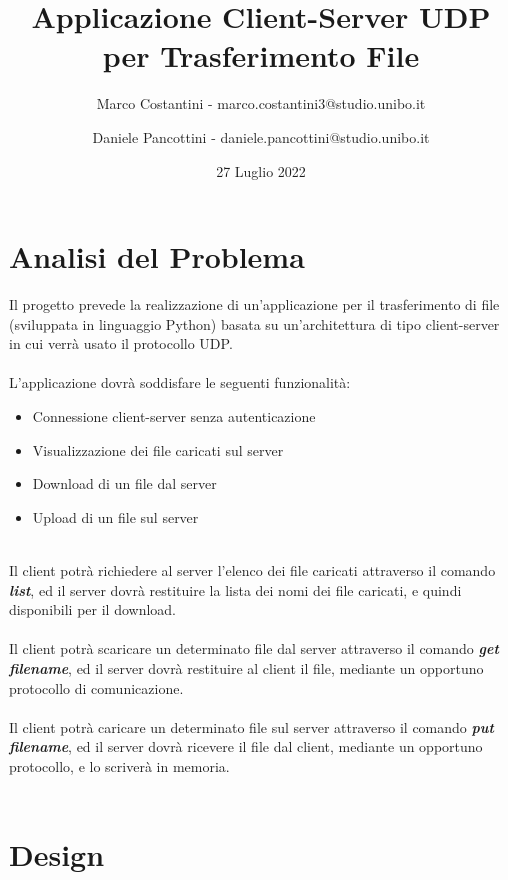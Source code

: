 \documentclass{article}
\title{Applicazione Client-Server UDP per Trasferimento File}
\author{Marco Costantini - marco.costantini3@studio.unibo.it \and Daniele Pancottini - daniele.pancottini@studio.unibo.it}
\date{27 Luglio 2022}
\begin{document}
\maketitle
\newpage

\tableofcontents

\newpage
\section{Analisi del Problema}


Il progetto prevede la realizzazione di un'applicazione per il trasferimento di file (sviluppata in linguaggio Python) basata su un'architettura di tipo client-server in cui verrà usato il protocollo UDP.\\\\
L'applicazione dovrà soddisfare le seguenti funzionalità:

	\begin{itemize}
		\item Connessione client-server senza autenticazione
		\item Visualizzazione dei file caricati sul server
		\item Download di un file dal server
		\item Upload di un file sul server
	\end{itemize}
\ \\
Il client potrà richiedere al server l'elenco dei file caricati attraverso il comando \textbf{\emph{list}}, ed il server dovrà restituire la lista dei nomi dei file caricati, e quindi disponibili per il download.\\\\
Il client potrà scaricare un determinato file dal server attraverso il comando \textbf{\emph{get filename}}, ed il server dovrà restituire al client il file, mediante un opportuno protocollo di comunicazione.\\\\
Il client potrà caricare un determinato file sul server attraverso il comando \textbf{\emph{put filename}}, ed il server dovrà ricevere il file dal client, mediante un opportuno protocollo, e lo scriverà in memoria.\\\\

\newpage
\section{Design}
\end{document}
